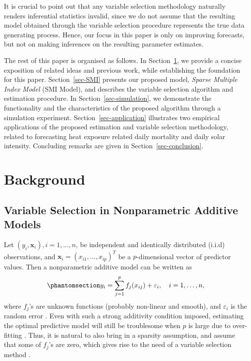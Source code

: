 \documentclass[
  11pt,
  a4paper,
]{article}
\begin{document}
It is crucial to point out that any variable selection methodology
naturally renders inferential statistics invalid, since we do not assume
that the resulting model obtained through the variable selection
procedure represents the true data generating process. Hence, our focus
in this paper is only on improving forecasts, but not on making
inferences on the resulting parameter estimates.

The rest of this paper is organised as follows. In
Section~\ref{sec-background}, we provide a concise exposition of related
ideas and previous work, while establishing the foundation for this
paper. Section~\ref{sec-SMI} presents our proposed model, \emph{Sparse
Multiple Index Model} (SMI Model), and describes the variable selection
algorithm and estimation procedure. In Section~\ref{sec-simulation}, we
demonstrate the functionality and the characteristics of the proposed
algorithm through a simulation experiment. Section~\ref{sec-application}
illustrates two empirical applications of the proposed estimation and
variable selection methodology, related to forecasting heat exposure
related daily mortality and daily solar intensity. Concluding remarks
are given in Section~\ref{sec-conclusion}.

\section{Background}\label{sec-background}

\subsection{Variable Selection in Nonparametric Additive
Models}\label{variable-selection-in-nonparametric-additive-models}

Let \((y_{i}, \bm{x}_{i}), i = 1, \dots, n\), be independent and
identically distributed (i.i.d) observations, and
\(\bm{x}_{i} = (x_{i1}, \dots, x_{ip})^{T}\) be a \(p\)-dimensional
vector of predictor values. Then a nonparametric additive model can be
written as \begin{equation}\phantomsection\label{eq-add}{
 y_{i} = \sum_{j=1}^{p} {f_{j}(x_{ij})} + \varepsilon_{i}, \quad i = 1, \dots, n,
}\end{equation} where \(f_{j}\)'s are unknown functions (probably
non-linear and smooth), and \(\varepsilon_{i}\) is the random error
\autocite{Lian2012}. Even with such a strong additivity condition
imposed, estimating the optimal predictive model will still be
troublesome when \(p\) is large due to over-fitting \autocite{Lian2012}.
Thus, it is natural to also bring in a sparsity assumption, and assume
that some of \(f_{j}\)'s are zero, which gives rise to the need of a
variable selection method \autocite{Huang2010}.
\end{document}

